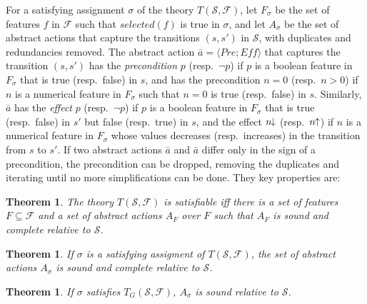 \documentclass[letterpaper]{article} %
\newcommand{\tup}[1]{\langle #1 \rangle}
\newtheorem{theorem}[definition]{Theorem}
\newcommand{\F}{\mathcal{F}}
\renewcommand{\S}{\mathcal{S}}
\newcommand{\Eff}{{\mathit{Eff}}}
\newcommand{\abst}[2]{\tup{#1;#2}}
\newcommand{\pplus}{\hspace{-.05em}\raisebox{.15ex}{\footnotesize$\uparrow$}}
\newcommand{\mminus}{\hspace{-.05em}\raisebox{.15ex}{\footnotesize$\downarrow$}}
\begin{document}
For a satisfying assignment $\sigma$ of the theory $T(\S,\F)$, let
$F_{\sigma}$ be the set of features $f$ in $\F$ such that $selected(f)$
is true in $\sigma$, and let $A_{\sigma}$ be the set of abstract actions
that capture the transitions $(s,s')$ in $\S$, with duplicates and redundancies removed.
The abstract action $\bar{a}=\abst{Pre}{\Eff}$ that captures the transition $(s,s')$
has the \emph{precondition} $p$ (resp.\ $\neg p$) if $p$ is a boolean feature in
$F_{\sigma}$ that is true (resp.\ false) in $s$, and has the precondition $n=0$
(resp.\ $n > 0$) if $n$ is a numerical feature in $F_{\sigma}$ such that $n=0$
is true (resp.\ false) in $s$. Similarly, $\bar{a}$ has the \emph{effect} $p$
(resp.\ $\neg p$) if $p$ is a boolean feature in $F_{\sigma}$ that is true
(resp.\ false) in $s'$ but false (resp.\ true) in $s$, and the effect $n\mminus$
(resp.\ $n\pplus$) if $n$ is a numerical feature in $F_{\sigma}$ whose values
decreases (resp.\ increases) in the transition from $s$ to $s'$. 
If two abstract actions $\bar{a}$ and $\bar{a}$ differ only in the sign of a
precondition, the precondition can be dropped, removing the duplicates and
iterating until no more simplifications can be done. They key properties are:

\begin{theorem}
  The theory $T(\S,\F)$ is satisfiable iff there is a set of features $F \subseteq \F$
  and a set of abstract actions $A_F$ over $F$ such that $A_F$ is sound and complete relative to  $\S$.
\end{theorem}

\begin{theorem}
  If $\sigma$ is a satisfying assigment of $T(\S,\F)$, the set of abstract
  actions $A_{\sigma}$ is sound and complete relative to $\S$.
\end{theorem}

\begin{theorem}
  If $\sigma$ satisfies  $T_G(\S,\F)$, $A_{\sigma}$  is sound relative to $\S$.
\end{theorem}
\end{document}
